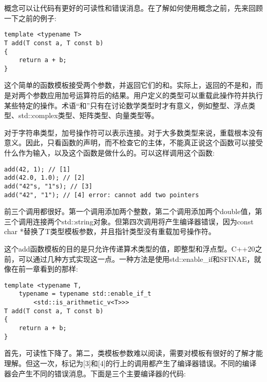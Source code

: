 概念可以让代码有更好的可读性和错误消息。在了解如何使用概念之前，先来回顾一下之前的例子:

\begin{lstlisting}[style=styleCXX]
template <typename T>
T add(T const a, T const b)
{
	return a + b;
}
\end{lstlisting}

这个简单的函数模板接受两个参数，并返回它们的和。实际上，返回的不是和，而是对两个参数应用加号运算符后的结果。用户定义的类型可以重载此操作符并执行某些特定的操作。术语“和”只有在讨论数学类型时才有意义，例如整型、浮点类型、std::complex类型、矩阵类型、向量类型等。

对于字符串类型，加号操作符可以表示连接。对于大多数类型来说，重载根本没有意义。因此，只看函数的声明，而不检查它的主体，不能真正说这个函数可以接受什么作为输入，以及这个函数是做什么的。可以这样调用这个函数:

\begin{lstlisting}[style=styleCXX]
add(42, 1); // [1]
add(42.0, 1.0); // [2]
add("42"s, "1"s); // [3]
add("42", "1"); // [4] error: cannot add two pointers
\end{lstlisting}

前三个调用都很好。第一个调用添加两个整数，第二个调用添加两个double值，第三个调用连接两个std::string对象。但第四次调用将产生编译器错误，因为const char *替换了T类型模板参数，并且指针类型没有重载加号操作符。

这个add函数模板的目的是只允许传递算术类型的值，即整型和浮点型。C++20之前，可以通过几种方式实现这一点。一种方法是使用std::enable\_if和SFINAE，就像在前一章看到的那样:

\begin{lstlisting}[style=styleCXX]
template <typename T,
	typename = typename std::enable_if_t
		<std::is_arithmetic_v<T>>>
T add(T const a, T const b)
{
	return a + b;
}
\end{lstlisting}

首先，可读性下降了。第二，类模板参数难以阅读，需要对模板有很好的了解才能理解。但这一次，标记为[3]和[4]的行上的调用都产生了编译器错误。不同的编译器会产生不同的错误消息。下面是三个主要编译器的代码:

